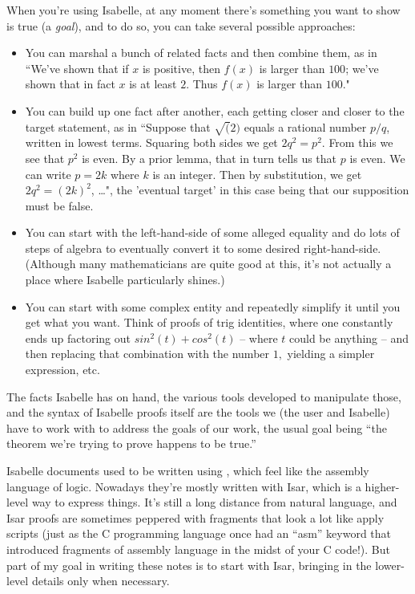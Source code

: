 When you're using Isabelle, at any moment there's something you want to show is true (a \textit{goal}), and to do so, you can take several possible approaches: 

\begin{itemize}
    \item 
You can marshal a bunch of related facts and then combine them, as in ``We've shown that if $x$ is positive, then $f(x)$ is larger than $100$; we've shown that in fact $x$ is at least $2$. Thus $f(x)$ is larger than $100.$" 
\item
You can build up one fact after another, each getting closer and closer to the target statement, as in ``Suppose that $\sqrt(2)$ equals a rational number $p/q$, written in lowest terms. Squaring both sides we get $2q^2 = p^2.$ From this we see that $p^2$ is even. By a prior lemma, that in turn tells us that $p$ is even. We can write $p = 2k$ where $k$ is an integer. Then by substitution, we get $2q^2 = (2k)^2$, \ldots", the 'eventual target' in this case being that our supposition must be false. 
\item
You can start with the left-hand-side of some alleged equality and do lots of steps of algebra to eventually convert it to some desired right-hand-side. (Although many mathematicians are quite good at this, it's not actually a place where Isabelle particularly shines.) 
\item 
You can start with some complex entity and repeatedly simplify it until you get what you want. Think of proofs of trig identities, where one constantly ends up factoring out $sin^2(t) + cos^2(t)$  -- where $t$ could be anything --  and then replacing that combination with the number $1,$ yielding a simpler expression, etc.
\end{itemize}
The facts Isabelle has on hand, the various tools developed to manipulate those, and the syntax of Isabelle proofs itself are the tools we (the user and Isabelle) have to work with to address the goals of our work, the usual goal being ``the theorem we're trying to prove happens to be true.'' 

Isabelle documents used to be written using , which feel like the assembly language of logic. Nowadays they're mostly written with Isar, which is a higher-level way to express things. It's still a long distance from natural language, and Isar proofs are sometimes peppered with fragments that look a lot like apply scripts (just as the C programming language once had an ``asm'' keyword that introduced fragments of assembly language in the midst of your C code!). But part of my goal in writing these notes is to start with Isar, bringing in the lower-level details only when necessary. 

